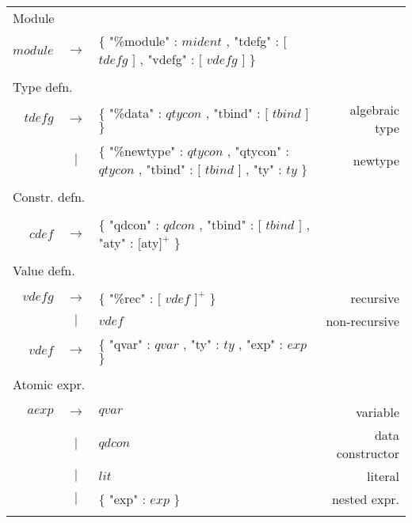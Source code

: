 \documentclass{article}
\begin{document}
\begin{footnotesize}
\begin{longtable}{ r c l r }

\\[0.01in]
\multicolumn{4}{l}{Module}		\\
$module$	& $ \rightarrow $ 	& $\{$ "\%module" : $mident$ , "tdefg" : $[$ $tdefg$ $]$ , "vdefg" : $[$ $vdefg$ $]$ $\}$			&			\\
\\[0.01in]

\multicolumn{4}{l}{Type defn.}		\\
$tdefg$ 	& $ \rightarrow $	& $\{$ "\%data" : $qtycon$ , "tbind" : $[$ $tbind$ $]$ $\}$							& algebraic type	\\
		& $ | $			& $\{$ "\%newtype" : $qtycon$ , "qtycon" : $qtycon$ , "tbind" : $[$ $tbind$ $]$ , "ty" : $ty$ $\}$ 		& newtype		\\
\\[0.01in]

\multicolumn{4}{l}{Constr. defn.}	\\
\\[0.01in]
$cdef$		& $ \rightarrow $	& $\{$ "qdcon" : $qdcon$ , "tbind" : $[$ $tbind$ $ ]$ , "aty" : $[$aty$]^{+}$ $\}$ 				& 			\\
\\[0.01in]

\multicolumn{4}{l}{Value defn.}		\\
\\[0.01in]
$vdefg$		& $ \rightarrow $	& $\{$ "\%rec" : $[$ $vdef$ $]^{+}$ $\}$    									& recursive		\\
		& $ | $			& $vdef$													& non-recursive		\\
$vdef$ 		& $ \rightarrow $	& $\{$ "qvar" : $qvar$ , "ty" : $ty$ , "exp" : $exp$ $\}$ 							& 			\\
\\[0.01in]

\multicolumn{4}{l}{Atomic expr.}	\\
\\[0.01in]
$aexp$		& $ \rightarrow $	& $qvar$													& variable		\\
		& $ | $			& $qdcon$													& data constructor	\\
		& $ | $			& $lit$														& literal		\\
		& $ | $			& $\{$ "exp" : $exp$ $\}$ 											& nested expr.		\\
\\[0.01in]


\end{longtable}
\end{footnotesize}
\end{document}
